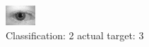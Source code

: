 \begin{figure}[h!]
\begin{center}
\includegraphics[width=0.60\columnwidth]{figures/ID541_class_2_target_3.png}
\end{center}
\caption{ Classification: 2 actual target: 3}
\label{fig:ID541_class_2_target_3}
\end{figure}
